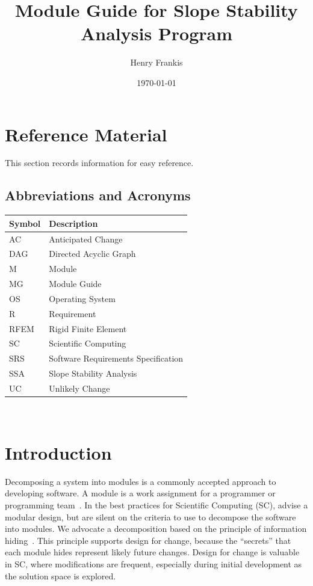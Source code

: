 \documentclass[12pt]{article}
\begin{document}
\title{Module Guide for Slope Stability Analysis Program} 
\author{Henry Frankis}
\date{\today}
	
\maketitle

\tableofcontents

\newpage

\section{Reference Material}
This section records information for easy reference.
\subsection{Abbreviations and Acronyms}

\renewcommand{\arraystretch}{1.2}
\begin{tabular}{l l} 
  \toprule		
  \textbf{Symbol} & \textbf{Description}\\
  \midrule 
  AC & Anticipated Change\\
  DAG & Directed Acyclic Graph \\
  M & Module \\
  MG & Module Guide \\
  OS & Operating System \\
  R & Requirement\\
  RFEM & Rigid Finite Element \\
  SC & Scientific Computing \\
  SRS & Software Requirements Specification\\
  SSA & Slope Stability Analysis\\
  UC & Unlikely Change \\
  \bottomrule
\end{tabular}\\

\section{Introduction}

\hspace{3ex}Decomposing a system into modules is a commonly accepted
approach to developing software.  A module is a work assignment for a
programmer or programming team~\citep{ParnasEtAl1984}.  In the best
practices for Scientific Computing (SC), \citet{WilsonEtAl2013} advise a
modular design, but are silent on the criteria to use to decompose the
software into modules.  We advocate a decomposition based on the
principle of information hiding~\citep{Parnas1972a}.  This principle
supports design for change, because the ``secrets'' that each module
hides represent likely future changes.  Design for change is valuable
in SC, where modifications are frequent, especially during initial
development as the solution space is explored.
\end{document}
